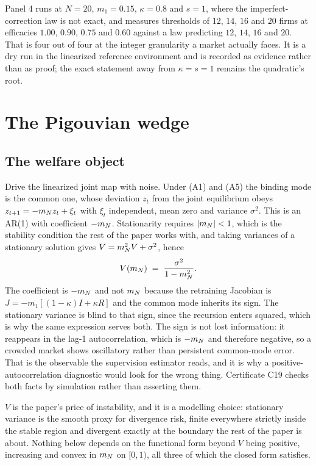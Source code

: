 Panel 4 runs at $N=20$, $m_1=0.15$, $\kappa=0.8$ and $s=1$, where the imperfect-correction law is not exact, and measures thresholds of $12$, $14$, $16$ and $20$ firms at efficacies $1.00$, $0.90$, $0.75$ and $0.60$ against a law predicting $12$, $14$, $16$ and $20$. That is four out of four at the integer granularity a market actually faces. It is a dry run in the linearized reference environment and is recorded as evidence rather than as proof; the exact statement away from $\kappa = s = 1$ remains the quadratic's root.

\section{The Pigouvian wedge}
\label{app:wedge}

\subsection{The welfare object}

Drive the linearized joint map with noise. Under (A1) and (A5) the binding mode is the common one, whose deviation $z_t$ from the joint equilibrium obeys $z_{t+1} = -m_N z_t + \xi_t$ with $\xi_t$ independent, mean zero and variance $\sigma^2$. This is an AR(1) with coefficient $-m_N$. Stationarity requires $|m_N| < 1$, which is the stability condition the rest of the paper works with, and taking variances of a stationary solution gives $V = m_N^2V + \sigma^2$, hence
\[
  V(m_N) \;=\; \frac{\sigma^2}{1-m_N^2}.
\]
The coefficient is $-m_N$ and not $m_N$ because the retraining Jacobian is $J = -m_1[(1-\kappa)I+\kappa R]$ and the common mode inherits its sign. The stationary variance is blind to that sign, since the recursion enters squared, which is why the same expression serves both. The sign is not lost information: it reappears in the lag-1 autocorrelation, which is $-m_N$ and therefore negative, so a crowded market shows oscillatory rather than persistent common-mode error. That is the observable the supervision estimator reads, and it is why a positive-autocorrelation diagnostic would look for the wrong thing. Certificate C19 checks both facts by simulation rather than asserting them.

$V$ is the paper's price of instability, and it is a modelling choice: stationary variance is the smooth proxy for divergence risk, finite everywhere strictly inside the stable region and divergent exactly at the boundary the rest of the paper is about. Nothing below depends on the functional form beyond $V$ being positive, increasing and convex in $m_N$ on $[0,1)$, all three of which the closed form satisfies.


